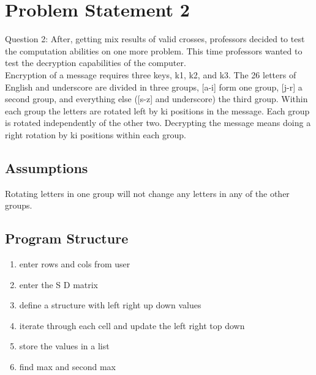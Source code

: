 \documentclass[12pt]{article}
\begin{document}
\pagebreak
\section{Problem Statement 2}
{\textbf{}Question 2:
After, getting mix results of valid crosses, professors decided to test the computation abilities on one more problem. This time professors wanted to test the decryption capabilities of the computer.\\
Encryption of  a message requires three keys, k1, k2, and k3. The 26 letters of English and underscore are divided in three groups,  [a-i] form one group, [j-r] a second group, and everything else ([s-z] and underscore) the third group. Within each group the letters are rotated left by ki positions in the message. Each group is rotated independently of the other two. Decrypting the message means doing a right rotation by ki positions within each group.

}



\subsection{Assumptions}
{
 Rotating letters in one group will not change any letters in any of the other groups.


}

\subsection{Program Structure}
{
\begin{enumerate}
\item enter rows and cols from user
\item enter the S D matrix
\item define a structure with left right up down values
\item iterate through each cell and update the left right top down
\item store the values in a list
\item find max and second max

\end{enumerate} 

}
\newpage
\end{document}
